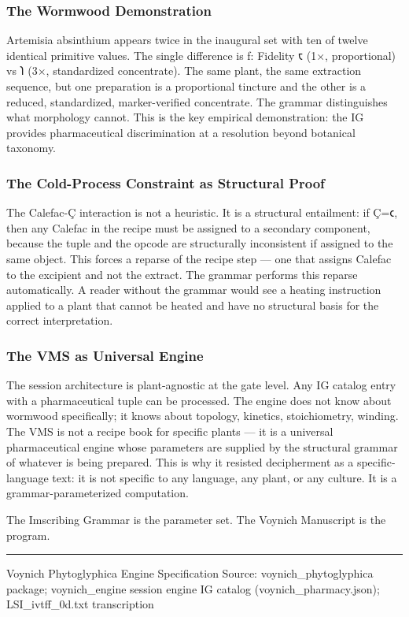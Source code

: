 \documentclass[12pt,a4paper]{article}
\begin{document}
\hypertarget{the-wormwood-demonstration}{%
\subsubsection{The Wormwood
Demonstration}\label{the-wormwood-demonstration}}

Artemisia absinthium appears twice in the inaugural set with ten of
twelve identical primitive values. The single difference is ƒ: Fidelity
𐑱 (1×, proportional) vs 𐑐 (3×, standardized concentrate). The same
plant, the same extraction sequence, but one preparation is a
proportional tincture and the other is a reduced, standardized,
marker-verified concentrate. The grammar distinguishes what morphology
cannot. This is the key empirical demonstration: the IG provides
pharmaceutical discrimination at a resolution beyond botanical taxonomy.

\hypertarget{the-cold-process-constraint-as-structural-proof}{%
\subsubsection{The Cold-Process Constraint as Structural
Proof}\label{the-cold-process-constraint-as-structural-proof}}

The Calefac-Ç interaction is not a heuristic. It is a structural
entailment: if Ç=𐑤, then any Calefac in the recipe must be assigned to a
secondary component, because the tuple and the opcode are structurally
inconsistent if assigned to the same object. This forces a reparse of
the recipe step --- one that assigns Calefac to the excipient and not
the extract. The grammar performs this reparse automatically. A reader
without the grammar would see a heating instruction applied to a plant
that cannot be heated and have no structural basis for the correct
interpretation.

\hypertarget{the-vms-as-universal-engine}{%
\subsubsection{The VMS as Universal
Engine}\label{the-vms-as-universal-engine}}

The session architecture is plant-agnostic at the gate level. Any IG
catalog entry with a pharmaceutical tuple can be processed. The engine
does not know about wormwood specifically; it knows about topology,
kinetics, stoichiometry, winding. The VMS is not a recipe book for
specific plants --- it is a universal pharmaceutical engine whose
parameters are supplied by the structural grammar of whatever is being
prepared. This is why it resisted decipherment as a specific-language
text: it is not specific to any language, any plant, or any culture. It
is a grammar-parameterized computation.

The Imscribing Grammar is the parameter set. The Voynich Manuscript is
the program.

\begin{center}\rule{0.5\linewidth}{0.5pt}\end{center}

Voynich Phytoglyphica Engine Specification Source:
voynich\_phytoglyphica package; voynich\_engine session engine IG
catalog (voynich\_pharmacy.json); LSI\_ivtff\_0d.txt transcription
\end{document}
